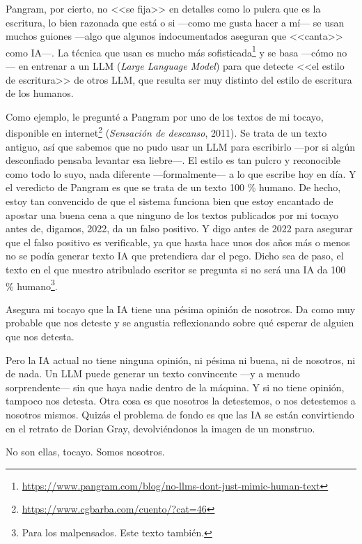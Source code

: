 \documentclass[11pt,a4paper]{article}
\begin{document}
Pangram, por cierto, no <<se fija>> en detalles como lo pulcra que es la escritura, lo bien razonada que está o si ---como me gusta hacer a mí--- se usan muchos guiones ---algo que algunos indocumentados aseguran que <<canta>> como IA---. La técnica que usan es mucho más sofisticada\footnote{\url{https://www.pangram.com/blog/no-llms-dont-just-mimic-human-text}} y se basa ---cómo no--- en entrenar a un LLM (\emph{Large Language Model}) para que detecte <<el estilo de escritura>> de otros LLM, que resulta ser muy distinto del estilo de escritura de los humanos. 

Como ejemplo, le pregunté a Pangram por uno de los textos de mi tocayo, disponible en internet\footnote{\url{https://www.cgbarba.com/cuento/?cat=46}} (\emph{Sensación de descanso}, 2011). Se trata de un texto antiguo, así que sabemos que no pudo usar un LLM para escribirlo ---por si algún desconfiado pensaba levantar esa liebre---. El estilo es tan pulcro y reconocible como todo lo suyo, nada diferente ---formalmente--- a lo que escribe hoy en día. Y el veredicto de Pangram es que se trata de un texto 100 \% humano. De hecho, estoy tan convencido de que el sistema funciona bien que estoy encantado de apostar una buena cena a que ninguno de los textos publicados por mi tocayo antes de, digamos, 2022, da un falso positivo. Y digo antes de 2022 para asegurar que el falso positivo es verificable, ya que hasta hace unos dos años más o menos no se podía generar texto IA que pretendiera dar el pego. Dicho sea de paso, el texto en el que nuestro atribulado escritor se pregunta si no será una IA da 100 \% humano\footnote{Para los malpensados. Este texto también.}. 

Asegura mi tocayo que la IA tiene una pésima opinión de nosotros. Da como muy probable que nos deteste y se angustia reflexionando sobre qué esperar de alguien que nos detesta. 

Pero la IA actual no tiene ninguna opinión, ni pésima ni buena, ni de nosotros, ni de nada. Un LLM puede generar un texto convincente ---y a menudo sorprendente--- sin que haya nadie dentro de la máquina. Y si no tiene opinión, tampoco nos detesta. Otra cosa es que nosotros la detestemos, o nos detestemos a nosotros mismos. Quizás el problema de fondo es que las IA se están convirtiendo en el retrato de Dorian Gray, devolviéndonos la imagen de un monstruo.

No son ellas, tocayo. Somos nosotros. 
\end{document}
